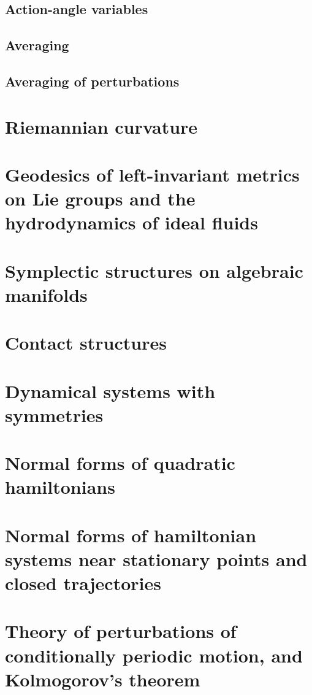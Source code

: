 \documentclass{book}
\numberwithin{equation}{section}
\theoremstyle{plain}
\theoremstyle{definition}
\theoremstyle{remark}
\theoremstyle{smallcap}
\numberwithin{prob}{section}
\begin{document}
\section{Action-angle variables}

\section{Averaging}

\section{Averaging of perturbations}

\appendix
\renewcommand{\thechapter}{\arabic{chapter}}

\chapter{Riemannian curvature}

\chapter{Geodesics of left-invariant metrics on Lie groups and
the hydrodynamics of ideal fluids}

\chapter{Symplectic structures on algebraic manifolds}

\chapter{Contact structures}

\chapter{Dynamical systems with symmetries}

\chapter{Normal forms of quadratic hamiltonians}

\chapter{Normal forms of hamiltonian systems near stationary points
and closed trajectories}

\chapter{Theory of perturbations of conditionally periodic motion,
and Kolmogorov's theorem}
\end{document}
